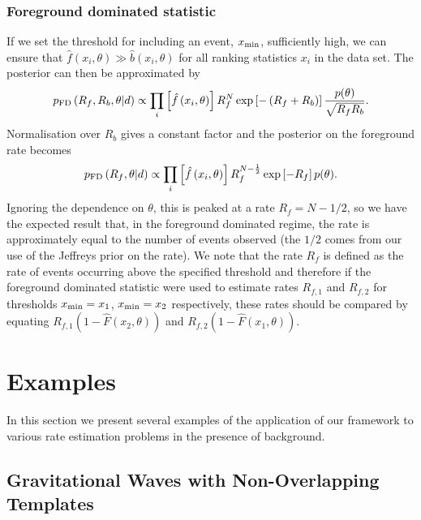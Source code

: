 \documentclass[aps,prd]{revtex4-1}
\begin{document}
\subsubsection{Foreground dominated statistic}
If we set the threshold for including an event, $x_{\rm min}$,
sufficiently high, we can ensure that $\hat{f}(x_i,\theta) \gg
\hat{b}(x_i,\theta)$ for all ranking statistics $x_i$ in the data
set. The posterior can then be approximated by
\begin{equation}
p_{\rm FD}\left( R_f, R_b, \theta | d \right) \propto \prod_{i} \left[
  \hat{f}\left(x_i, \theta\right)\right] R_f^N \exp\left[-\left( R_f +
  R_b \right) \right] \frac{p(\theta)}{\sqrt{R_f R_b}}.
\end{equation}
Normalisation over $R_b$ gives a constant factor and the posterior on
the foreground rate becomes
\begin{equation}
p_{\rm FD}\left( R_f, \theta | d \right) \propto \prod_{i} \left[
  \hat{f}\left(x_i, \theta\right)\right] R_f^{N-\frac{1}{2}}
\exp\left[-R_f \right] p(\theta).
\end{equation}
Ignoring the dependence on $\theta$, this is peaked at a rate $R_f =
N-1/2$, so we have the expected result that, in the foreground
dominated regime, the rate is approximately equal to the number of
events observed (the $1/2$ comes from our use of the Jeffreys prior on
the rate).  We note that the rate $R_f$ is defined as the rate of
events occurring above the specified threshold and therefore if the
foreground dominated statistic were used to estimate rates $R_{f,1}$
and $R_{f,2}$ for thresholds $x_{\rm min}=x_1$, $x_{\rm min}=x_2$
respectively, these rates should be compared by equating $R_{f,1}
(1-\hat{F}(x_2,\theta))$ and $R_{f,2} (1-\hat{F}(x_1,\theta))$.

\section{Examples}
\label{sec:GW-example}

In this section we present several examples of the application of our
framework to various rate estimation problems in the presence of
background.

\subsection{Gravitational Waves with Non-Overlapping Templates}
\label{sec:analytic-GW-example}
\end{document}
